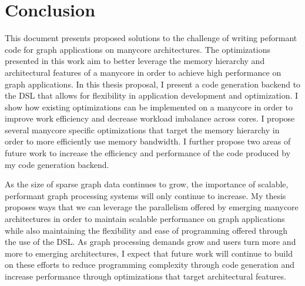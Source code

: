\chapter{Conclusion}\label{gen:sec:conclusion}

This document presents proposed solutions to the challenge of writing peformant code for graph applications on manycore architectures. 
The optimizations presented in this work aim to better leverage the memory hierarchy and architectural features of a manycore in order to achieve high performance on graph applications. 
In this thesis proposal, I present a code generation backend to the \graphit DSL that allows for flexibility in application development and optimization. 
I show how existing optimizations can be implemented on a manycore in order to improve work efficiency and decrease workload imbalance across cores. 
I propose several manycore specific optimizations that target the memory hierarchy in order to more efficiently use memory bandwidth.
I further propose two areas of future work to increase the efficiency and performance of the code produced by my \graphit code generation backend. 

As the size of sparse graph data continues to grow, the importance of scalable, performant graph processing systems will only continue to increase. 
My thesis proposes ways that we can leverage the parallelism offered by emerging manycore architectures in order to maintain scalable performance on graph applications while also maintaining the flexibility and ease of programming offered through the use of the \graphit DSL. 
As graph processing demands grow and users turn more and more to emerging architectures, I expect that future work will continue to build on these efforts to reduce programming complexity through code generation and increase performance through optimizations that target architectural features. 

